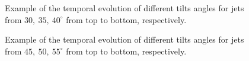 \documentclass[12pt]{ociamthesis}
\begin{document}
\begin{figure}
\captionsetup[subfigure]{labelformat=empty}
\centering
{}
\caption{Example of the temporal evolution of different tilts angles for jets from $30,~35,~40^{\circ}$ from top to bottom, respectively.}
\label{tj_morph_3}
\end{figure}
\begin{figure}
\captionsetup[subfigure]{labelformat=empty}
\centering
{}
\caption{Example of the temporal evolution of different tilts angles for jets from $45,~50,~55^{\circ}$ from top to bottom, respectively.}
\label{tj_morph_4}
\end{figure}
\end{document}
